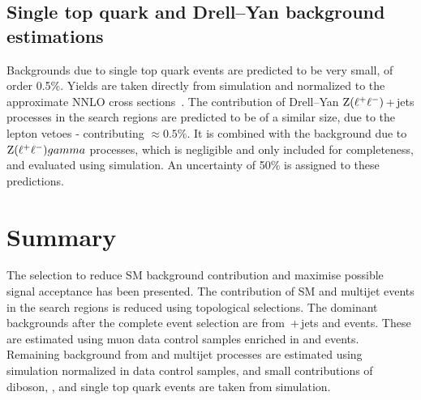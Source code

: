 \subsection{Single top quark and Drell--Yan background estimations}

Backgrounds due to single top quark events are predicted to be very small, of order 0.5\%.
Yields are taken directly from simulation and normalized to the approximate \ac{NNLO} cross sections~\cite{ttbarxs}. 
The contribution of Drell--Yan $\mathrm{Z} ( \ell^{+} \ell^{-} )$\,+\,jets processes in the search regions are predicted to be of a similar size, due to the lepton vetoes - contributing $\approx0.5\%$.
It is combined with the background due to $\mathrm{Z} ( \ell^{+} \ell^{-} ) gamma$ processes, which is negligible and only included for completeness,
and evaluated using simulation.
An uncertainty of 50\% is assigned to these predictions.


\section{Summary}
The selection to reduce \ac{SM} background contribution and maximise possible signal acceptance has been presented. 
The contribution of SM \ttbar and multijet events in the search regions is reduced using topological selections. The dominant backgrounds after the complete event selection are from \znunubr{}\,+\,jets and \wpj{} events. These are estimated using muon data control samples enriched in \zmumubr and \wmunubr events. Remaining background from \ttbar and multijet processes are estimated using simulation normalized in data control samples, and small contributions of diboson, \zellellbr, and single top quark events are taken from simulation.

\clearpage
